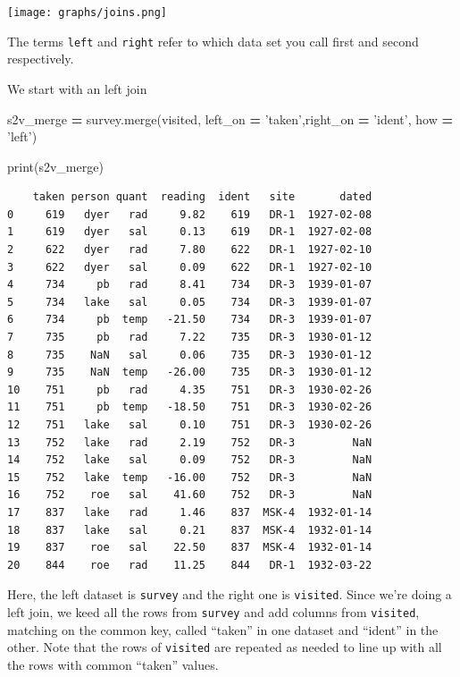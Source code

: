 \documentclass[
  letterpaper,
]{scrbook}
\newenvironment{Shaded}{\begin{snugshade}}{\end{snugshade}}
\newcommand{\BuiltInTok}[1]{#1}
\newcommand{\NormalTok}[1]{#1}
\newcommand{\OperatorTok}[1]{\textcolor[rgb]{0.81,0.36,0.00}{\textbf{#1}}}
\newcommand{\StringTok}[1]{\textcolor[rgb]{0.31,0.60,0.02}{#1}}
\begin{document}
\texttt{[image: graphs/joins.png]}

The terms \texttt{left} and \texttt{right} refer to which data set you call first and second respectively.

We start with an left join

\begin{Shaded}
\begin{Highlighting}[]
\NormalTok{s2v_merge }\OperatorTok{=}\NormalTok{ survey.merge(visited, left_on }\OperatorTok{=} \StringTok{'taken'}\NormalTok{,right_on }\OperatorTok{=} \StringTok{'ident'}\NormalTok{, how }\OperatorTok{=} \StringTok{'left'}\NormalTok{)}
\end{Highlighting}
\end{Shaded}

\begin{Shaded}
\begin{Highlighting}[]
\BuiltInTok{print}\NormalTok{(s2v_merge)}
\end{Highlighting}
\end{Shaded}

\begin{verbatim}
    taken person quant  reading  ident   site       dated
0     619   dyer   rad     9.82    619   DR-1  1927-02-08
1     619   dyer   sal     0.13    619   DR-1  1927-02-08
2     622   dyer   rad     7.80    622   DR-1  1927-02-10
3     622   dyer   sal     0.09    622   DR-1  1927-02-10
4     734     pb   rad     8.41    734   DR-3  1939-01-07
5     734   lake   sal     0.05    734   DR-3  1939-01-07
6     734     pb  temp   -21.50    734   DR-3  1939-01-07
7     735     pb   rad     7.22    735   DR-3  1930-01-12
8     735    NaN   sal     0.06    735   DR-3  1930-01-12
9     735    NaN  temp   -26.00    735   DR-3  1930-01-12
10    751     pb   rad     4.35    751   DR-3  1930-02-26
11    751     pb  temp   -18.50    751   DR-3  1930-02-26
12    751   lake   sal     0.10    751   DR-3  1930-02-26
13    752   lake   rad     2.19    752   DR-3         NaN
14    752   lake   sal     0.09    752   DR-3         NaN
15    752   lake  temp   -16.00    752   DR-3         NaN
16    752    roe   sal    41.60    752   DR-3         NaN
17    837   lake   rad     1.46    837  MSK-4  1932-01-14
18    837   lake   sal     0.21    837  MSK-4  1932-01-14
19    837    roe   sal    22.50    837  MSK-4  1932-01-14
20    844    roe   rad    11.25    844   DR-1  1932-03-22
\end{verbatim}

Here, the left dataset is \texttt{survey} and the right one is \texttt{visited}. Since we're doing a left join, we keed all the rows from \texttt{survey} and add columns from \texttt{visited}, matching on the common key, called ``taken'' in one dataset and ``ident'' in the other. Note that the rows of \texttt{visited} are repeated as needed to line up with all the rows with common ``taken'' values.
\end{document}

